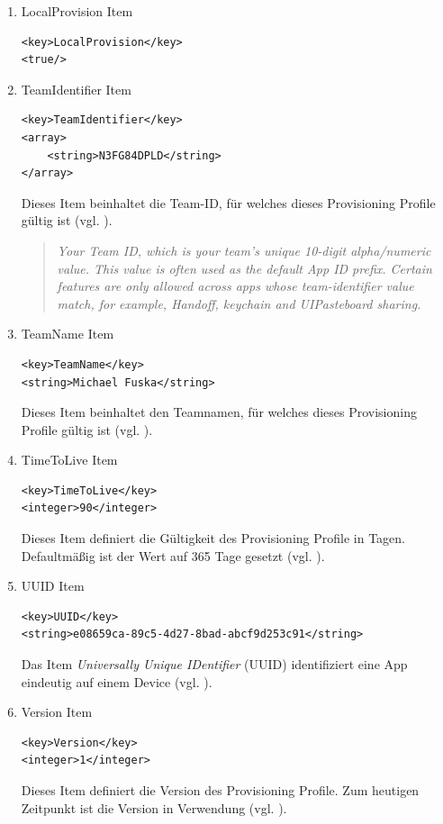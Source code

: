 \begin{enumerate}
  \item LocalProvision Item
\begin{lstlisting}[captionpos=b, caption={LocalProvision Item}]
<key>LocalProvision</key>
<true/>
\end{lstlisting}

    \item TeamIdentifier Item
\begin{lstlisting}[captionpos=b, caption={TeamIdentifier Item}]
<key>TeamIdentifier</key>
<array>
    <string>N3FG84DPLD</string>
</array>
\end{lstlisting}
Dieses Item beinhaltet die Team-ID, für welches dieses Provisioning Profile gültig ist (vgl. \cite{iOSSec[5], Hacking[1]}). \par
\begin{quote}
    \glqq \textit{Your Team ID, which is your team's unique 10-digit alpha/numeric value. This value is often used as the default App ID prefix. Certain features are only allowed across apps whose team-identifier value match, for example, Handoff, keychain and UIPasteboard sharing.}\grqq{} \cite{ProvisioningProfile[3]}
\end{quote}
    \item TeamName Item
\begin{lstlisting}[captionpos=b, caption={TeamName Item}]
<key>TeamName</key>
<string>Michael Fuska</string>
\end{lstlisting}
 Dieses Item beinhaltet den Teamnamen, für welches dieses Provisioning Profile gültig ist (vgl. \cite{iOSSec[5], Hacking[1]}).

   \item TimeToLive Item
\begin{lstlisting}[captionpos=b, caption={TimeToLive Item}]
<key>TimeToLive</key>
<integer>90</integer>
\end{lstlisting}
Dieses Item definiert die Gültigkeit des Provisioning Profile in Tagen. Defaultmäßig ist der Wert auf 365 Tage gesetzt (vgl. \cite{iOSSec[5], Hacking[1]}).
 
    \item UUID Item
\begin{lstlisting}[captionpos=b, caption={UUID Item}]
<key>UUID</key>
<string>e08659ca-89c5-4d27-8bad-abcf9d253c91</string>
\end{lstlisting}
Das Item \textit{\glqq Universally Unique IDentifier\grqq{}} (UUID) identifiziert eine App eindeutig auf einem Device (vgl. \cite{iOSSec[5], Hacking[1]}).

    \item Version Item
\begin{lstlisting}[captionpos=b, caption={Version Item}]
<key>Version</key>
<integer>1</integer> 
\end{lstlisting}
Dieses Item definiert die Version des Provisioning Profile. Zum heutigen Zeitpunkt ist die Version \textit{\grqq{}} in Verwendung (vgl. \cite{iOSSec[5], Hacking[1]}).
\end{enumerate}

